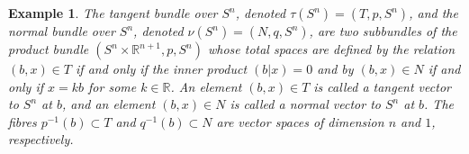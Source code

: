 \documentclass[10pt,a4paper]{amsart}
\newtheorem{exam}{Example}
\begin{document}
	\begin{exam}
		The tangent bundle over $S^n$, denoted $\tau (S^n) = (T, p, S^n)$, and the normal bundle over $S^n$, denoted $\nu (S^n) = (N, q, S^n)$, are two subbundles of the product bundle $(S^n \times \mathbb{R}^{n+1}, p, S^n)$ whose total spaces are defined by the relation $(b,x) \in T$ if and only if the inner product $(b|x) = 0$ and by $(b,x) \in N$ if and only if   $x = kb$ for some $k \in \mathbb{R}$. 
		An element $(b,x) \in T$ is called a tangent vector to $S^n$ at $b$, and an  element $(b,x) \in N$ is called a normal vector to $S^n$ at $b$. The fibres $p^{-1}(b) \subset T $ and $q^{-1}(b) \subset N $ are vector spaces of dimension $n$ and $1$, respectively.
	\end{exam}
\end{document}
